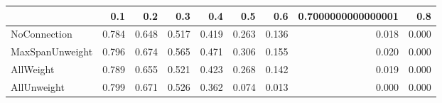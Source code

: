 \begin{tabular}{lrrrrrrrr}
\toprule
{} &   0.1 &   0.2 &   0.3 &   0.4 &   0.5 &   0.6 & 0.7000000000000001 &   0.8 \\
\midrule
NoConnection    & 0.784 & 0.648 & 0.517 & 0.419 & 0.263 & 0.136 &              0.018 & 0.000 \\
MaxSpanUnweight & 0.796 & 0.674 & 0.565 & 0.471 & 0.306 & 0.155 &              0.020 & 0.000 \\
AllWeight       & 0.789 & 0.655 & 0.521 & 0.423 & 0.268 & 0.142 &              0.019 & 0.000 \\
AllUnweight     & 0.799 & 0.671 & 0.526 & 0.362 & 0.074 & 0.013 &              0.000 & 0.000 \\
\bottomrule
\end{tabular}
